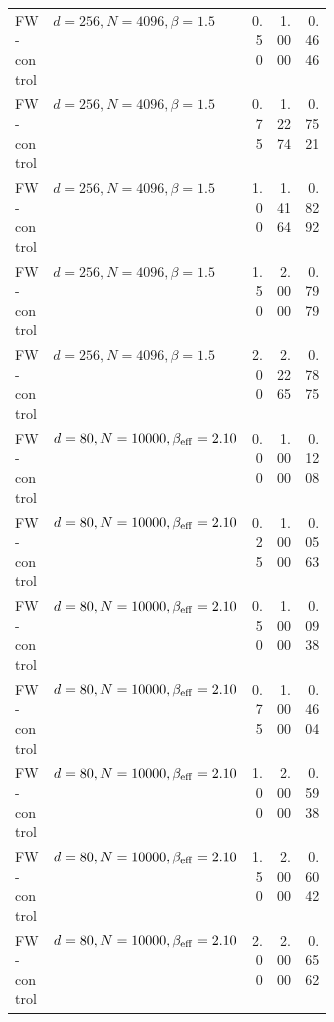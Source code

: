 \documentclass[11pt]{article}
\begin{document}
\begin{longtable}{L{0.12\linewidth}L{0.25\linewidth}rrr}
FW-control & $d=256,N=4096,\beta=1.5$ & 0.50 & 1.0000 & 0.4646 \\
FW-control & $d=256,N=4096,\beta=1.5$ & 0.75 & 1.2274 & 0.7521 \\
FW-control & $d=256,N=4096,\beta=1.5$ & 1.00 & 1.4164 & 0.8292 \\
FW-control & $d=256,N=4096,\beta=1.5$ & 1.50 & 2.0000 & 0.7979 \\
FW-control & $d=256,N=4096,\beta=1.5$ & 2.00 & 2.2265 & 0.7875 \\
FW-control & $d=80,N=10000,\beta_{\rm eff}=2.10$ & 0.00 & 1.0000 & 0.1208 \\
FW-control & $d=80,N=10000,\beta_{\rm eff}=2.10$ & 0.25 & 1.0000 & 0.0563 \\
FW-control & $d=80,N=10000,\beta_{\rm eff}=2.10$ & 0.50 & 1.0000 & 0.0938 \\
FW-control & $d=80,N=10000,\beta_{\rm eff}=2.10$ & 0.75 & 1.0000 & 0.4604 \\
FW-control & $d=80,N=10000,\beta_{\rm eff}=2.10$ & 1.00 & 2.0000 & 0.5938 \\
FW-control & $d=80,N=10000,\beta_{\rm eff}=2.10$ & 1.50 & 2.0000 & 0.6042 \\
FW-control & $d=80,N=10000,\beta_{\rm eff}=2.10$ & 2.00 & 2.0000 & 0.6562 \\
\bottomrule
\end{longtable}
\end{document}
